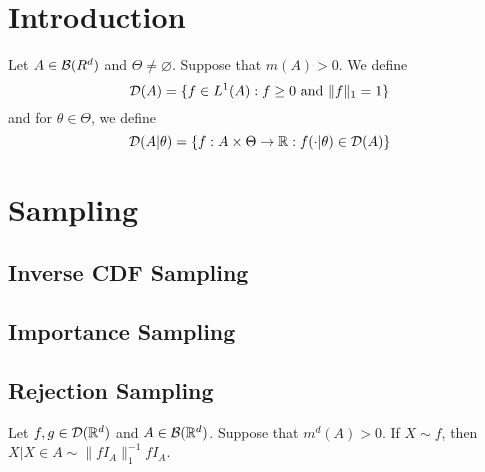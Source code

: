 \documentclass{book}
\begin{document}
	
	\section{Introduction}
	\begin{defn}
		Let $A \in \mathcal{B}(R^d)$ and $\Theta \neq \varnothing$. Suppose that $m(A) > 0$. We define 
		$$\mathcal{D}(A) = \{f \in L^1(A) : f \geq 0 \text{ and } \|f\|_1 = 1\}$$ 
		and for $\theta \in \Theta$, we define
		$$\mathcal{D}(A|\theta) = \{f: A \times \Theta \rightarrow \mathbb{R} : f(\cdot| \theta) \in \mathcal{D}(A)\}$$
	\end{defn}
	
	
	
	
	
	
	\newpage
	\section{Sampling}
	
	\subsection{Inverse CDF Sampling}
	
	
	













	\newpage
	
	\subsection{Importance Sampling}
	
	
	
	
	
	
	
	
	
	
	
	
	
	
	
	
	
	
	
	
	
	\newpage
	\subsection{Rejection Sampling}
	
	\begin{ex}
		Let $f, g \in \mathcal{D}(\mathbb{R}^d)$ and $A \in \mathcal{B}(\mathbb{R}^d)$. Suppose that $m^d(A) > 0$. If $X \sim f$, then $X|X \in A \sim \|fI_A\|_1^{-1}fI_A$. 
	\end{ex}
\end{document}
